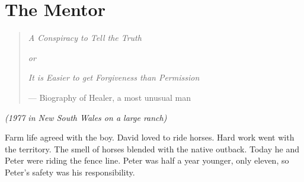 
\chapter{The Mentor}
\label{pos03:the-mentor}

%
%


\begin{quote}
\textit{A Conspiracy to Tell the Truth}

\textit{or}

\textit{It is Easier to get Forgiveness than Permission}

\hfill --- Biography of Healer, a most unusual man
\end{quote}

\vspace{0.5cm}

\noindent\textit{(1977 in New South Wales on a large ranch)}

\vspace{0.5cm}

Farm life agreed with the boy.  David loved to ride horses.  Hard work went with the territory.  The smell of horses blended with the native outback.  Today he and Peter were riding the fence line.  Peter was half a year younger, only eleven, so Peter's safety was his responsibility.

